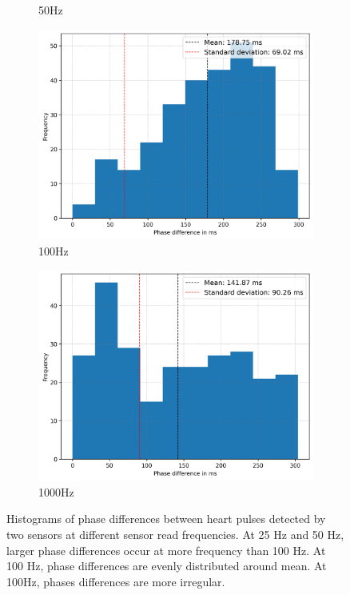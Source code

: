 \begin{figure}[t]
\begin{subfigure}{0.5\linewidth}
        \caption{50Hz}
        \label{fig:histogram_50}
        \vspace{1\baselineskip}
    \end{subfigure}
    \begin{subfigure}{0.5\linewidth}
        \centering
        \includegraphics[width=\linewidth]{chapters/Results/histogram_100.png}
        \caption{100Hz}
        \label{fig:histogram_100}
    \end{subfigure}
    \begin{subfigure}{0.5\linewidth}
        \centering
        \includegraphics[width=\linewidth]{chapters/Results/histogram_1000.png}
        \caption{1000Hz}
        \label{fig:histogram_1000}
    \end{subfigure}
    \caption{Histograms of phase differences between heart pulses detected by two sensors at different sensor read frequencies. At 25 Hz and 50 Hz, larger phase differences occur at more frequency than 100 Hz. At 100 Hz, phase differences are evenly distributed around mean. At 100Hz, phases differences are more irregular.}
    \label{fig:histograms_sensor_accuracy}
\end{figure}

